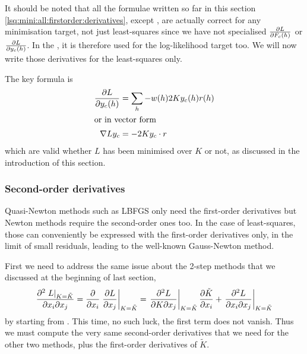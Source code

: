 \documentclass[11pt]{article}
\begin{document}
It should be noted that all the formulae written so far in this section \ref{lsq:mini:all:firstorder:derivatives}, except , are actually correct for any minimisation target, not just least-squares since we have not specialised $\frac{\partial L}{\partial F_c(h)}$ or $\frac{\partial L}{\partial y_c(h)}$. In the , it is therefore used for the log-likelihood target too. We will now write those derivatives for the least-squares only.

The key formula is
\begin{align}
\partialder{L}{y_c(h)} &= \sum_h - w(h) 2K y_c(h) r(h)\\
\intertext{or in vector form}
\grad{L}{y_c} &= -2K y_c \cdot r
\end{align}
which are valid whether $L$ has been minimised over $K$ or not, as discussed in the introduction of this section.

\subsubsection{Second-order derivatives}

Quasi-Newton methods such as LBFGS only need the first-order derivatives but Newton methods require the second-order ones too. In the case of least-squares, those can conveniently be expressed with the first-order derivatives only, in the limit of small residuals, leading to the well-known Gauss-Newton method.

First we need to address the same issue about the 2-step methods that we discussed at the beginning of last section,
\begin{equation}
\frac{\partial^2 \left. L \right|_{K=\tilde{K}}}{\partial x_i \partial x_j} = \frac{\partial }{\partial x_i} \left.\frac{\partial L}{\partial x_j}\right|_{K=\tilde{K}} = \left.\frac{\partial^2 L}{\partial K \partial x_j}\right|_{K=\tilde{K}}  \frac{\partial \tilde{K}}{\partial x_i} +   \left.\frac{\partial^2 L}{\partial x_i \partial x_j}\right|_{K=\tilde{K}}
\label{eqn:der:xi:xj:twostep}
\end{equation}
by starting from . This time, no such luck, the first term does not vanish. Thus we must compute the very same second-order derivatives that we need for the other two methods, plus the first-order derivatives of $\tilde{K}$.
\end{document}
